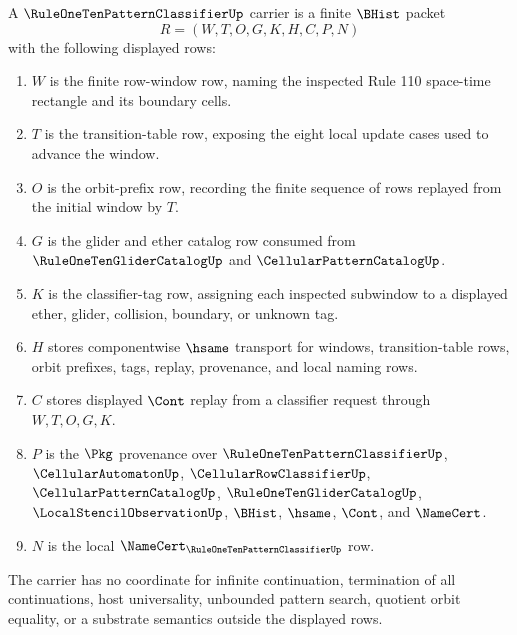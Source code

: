 \begin{definition}
\label{def:rule110-pattern-classifier-carrier}
A $\RuleOneTenPatternClassifierUp$ carrier is a finite $\BHist$ packet
$$
R=(W,T,O,G,K,H,C,P,N)
$$
with the following displayed rows:
\begin{enumerate}
\item $W$ is the finite row-window row, naming the inspected Rule 110 space-time rectangle and its boundary cells.
\item $T$ is the transition-table row, exposing the eight local update cases used to advance the window.
\item $O$ is the orbit-prefix row, recording the finite sequence of rows replayed from the initial window by $T$.
\item $G$ is the glider and ether catalog row consumed from $\RuleOneTenGliderCatalogUp$ and $\CellularPatternCatalogUp$.
\item $K$ is the classifier-tag row, assigning each inspected subwindow to a displayed ether, glider, collision, boundary, or unknown tag.
\item $H$ stores componentwise $\hsame$ transport for windows, transition-table rows, orbit prefixes, tags, replay, provenance, and local naming rows.
\item $C$ stores displayed $\Cont$ replay from a classifier request through $W,T,O,G,K$.
\item $P$ is the $\Pkg$ provenance over $\RuleOneTenPatternClassifierUp$, $\CellularAutomatonUp$, $\CellularRowClassifierUp$, $\CellularPatternCatalogUp$, $\RuleOneTenGliderCatalogUp$, $\LocalStencilObservationUp$, $\BHist$, $\hsame$, $\Cont$, and $\NameCert$.
\item $N$ is the local $\NameCert_{\RuleOneTenPatternClassifierUp}$ row.
\end{enumerate}
The carrier has no coordinate for infinite continuation, termination of all continuations, host universality, unbounded pattern search, quotient orbit equality, or a substrate semantics outside the displayed rows.
\end{definition}

